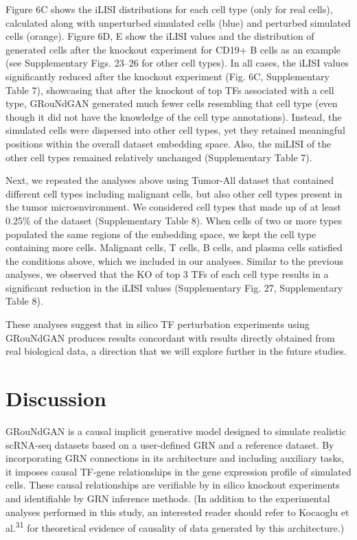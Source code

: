 Figure 6C shows the iLISI distributions for each cell type (only for real cells), calculated along with unperturbed simulated cells (blue) and perturbed simulated cells (orange). Figure 6D, E show the iLISI values and the distribution of generated cells after the knockout experiment for CD19+ B cells as an example (see Supplementary Figs. 23–26 for other cell types). In all cases, the iLISI values significantly reduced after the knockout experiment (Fig. 6C, Supplementary Table 7), showcasing that after the knockout of top TFs associated with a cell type, GRouNdGAN generated much fewer cells resembling that cell type (even though it did not have the knowledge of the cell type annotations). Instead, the simulated cells were dispersed into other cell types, yet they retained meaningful positions within the overall dataset embedding space. Also, the miLISI of the other cell types remained relatively unchanged (Supplementary Table 7).

Next, we repeated the analyses above using Tumor-All dataset that contained different cell types including malignant cells, but also other cell types present in the tumor microenvironment. We considered cell types that made up of at least 0.25\% of the dataset (Supplementary Table 8). When cells of two or more types populated the same regions of the embedding space, we kept the cell type containing more cells. Malignant cells, T cells, B cells, and plasma cells satisfied the conditions above, which we included in our analyses. Similar to the previous analyses, we observed that the KO of top 3 TFs of each cell type results in a significant reduction in the iLISI values (Supplementary Fig. 27, Supplementary Table 8).

These analyses suggest that in silico TF perturbation experiments using GRouNdGAN produces results concordant with results directly obtained from real biological data, a direction that we will explore further in the future studies.

\section*{Discussion}
\label{sec:groundgan:discussion}

GRouNdGAN is a causal implicit generative model designed to simulate realistic scRNA-seq datasets based on a user-defined GRN and a reference dataset. By incorporating GRN connections in its architecture and including auxiliary tasks, it imposes causal TF-gene relationships in the gene expression profile of simulated cells. These causal relationships are verifiable by in silico knockout experiments and identifiable by GRN inference methods. (In addition to the experimental analyses performed in this study, an interested reader should refer to Kocaoglu et al.\textsuperscript{31} for theoretical evidence of causality of data generated by this architecture.)

